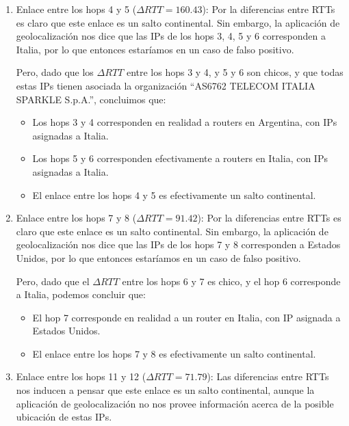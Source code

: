\begin{enumerate}
  \item Enlace entre los hops 4 y 5 ($\Delta RTT = 160.43$): Por la diferencias entre RTTs es claro que este enlace es un salto continental. Sin embargo, la aplicación de geolocalización nos dice que las IPs de los hops 3, 4, 5 y 6 corresponden a Italia, por lo que entonces estaríamos en un caso de falso positivo.

    Pero, dado que los $\Delta RTT$ entre los hops 3 y 4, y 5 y 6 son chicos, y que todas estas IPs tienen asociada la organización ``AS6762 TELECOM ITALIA SPARKLE S.p.A.'', concluimos que:

    \begin{itemize}
      \item Los hops 3 y 4 corresponden en realidad a routers en Argentina, con IPs asignadas a Italia.
      \item Los hops 5 y 6 corresponden efectivamente a routers en Italia, con IPs asignadas a Italia.
      \item El enlace entre los hops 4 y 5 es efectivamente un salto continental.
    \end{itemize}

  \item Enlace entre los hops 7 y 8 ($\Delta RTT = 91.42$): Por la diferencias entre RTTs es claro que este enlace es un salto continental. Sin embargo, la aplicación de geolocalización nos dice que las IPs de los hops 7 y 8 corresponden a Estados Unidos, por lo que entonces estaríamos en un caso de falso positivo.

  Pero, dado que el $\Delta RTT$ entre los hops 6 y 7 es chico, y el hop 6 corresponde a Italia, podemos concluir que:
  \begin{itemize}
    \item El hop 7 corresponde en realidad a un router en Italia, con IP asignada a Estados Unidos.
    \item El enlace entre los hops 7 y 8 es efectivamente un salto continental.
  \end{itemize}

  \item Enlace entre los hops 11 y 12 ($\Delta RTT = 71.79$): Las diferencias entre RTTs nos inducen a pensar que este enlace es un salto continental, aunque la aplicación de geolocalización no nos provee información acerca de la posible ubicación de estas IPs.


\end{enumerate}
